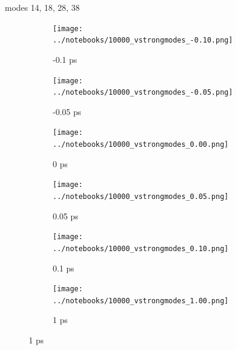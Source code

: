\documentclass{beamer}
\begin{document}
\begin{frame}{modes 14, 18, 28, 38}
	\begin{figure}
		\centering
		\begin{subfigure}[b]{\w\textwidth}
			\centering
			\texttt{[image: ../notebooks/10000\_vstrongmodes\_-0.10.png]}
			\caption{-0.1 ps}
		\end{subfigure}
		\begin{subfigure}[b]{\w\textwidth}
			\centering
			\texttt{[image: ../notebooks/10000\_vstrongmodes\_-0.05.png]}
			\caption{-0.05 ps}
		\end{subfigure}
		\begin{subfigure}[b]{\w\textwidth}
			\centering
			\texttt{[image: ../notebooks/10000\_vstrongmodes\_0.00.png]}
			\caption{0 ps}
		\end{subfigure}
		\begin{subfigure}[b]{\w\textwidth}
			\centering
			\texttt{[image: ../notebooks/10000\_vstrongmodes\_0.05.png]}
			\caption{0.05 ps}
		\end{subfigure}
		\begin{subfigure}[b]{\w\textwidth}
			\centering
			\texttt{[image: ../notebooks/10000\_vstrongmodes\_0.10.png]}
			\caption{0.1 ps}
		\end{subfigure}
		\begin{subfigure}[b]{\w\textwidth}
			\centering
			\texttt{[image: ../notebooks/10000\_vstrongmodes\_1.00.png]}
			\caption{1 ps}
		\end{subfigure}
	\end{figure}
\end{frame}
\end{document}
